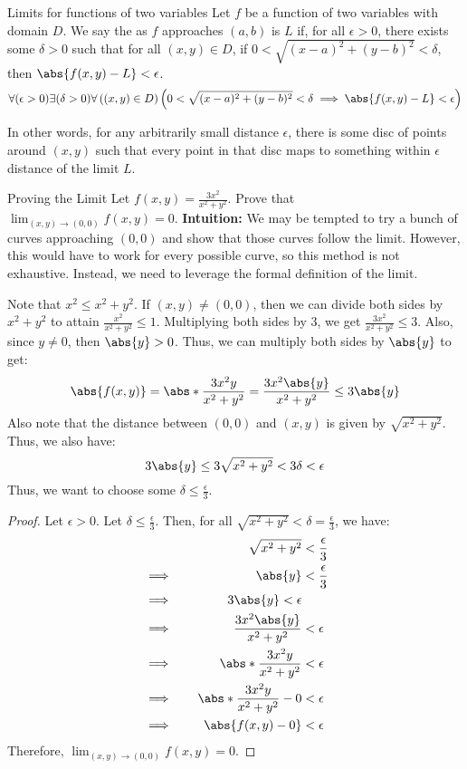 \documentclass[math]{amznotes}
\begin{document}
\begin{dfnbox}{Limits for functions of two variables}{}
    Let $f$ be a function of two variables with domain $D$. We say the  as $f$ approaches $(a,b)$ is $L$ if, for all $\epsilon > 0$, there exists some $\delta > 0$ such that for all $(x,y) \in D$, if $0 < \sqrt{(x-a)^2 + (y-b)^2} < \delta$, then $\abs{f(x,y) - L} < \epsilon$.
    \tcblower
    \[ \forall(\epsilon > 0) \exists(\delta > 0) \forall \left( (x,y) \in D \right) \left(0 < \sqrt{(x-a)^2 + (y-b)^2} < \delta \implies \abs{f(x,y) - L} < \epsilon\right) \]
\end{dfnbox}

In other words, for any arbitrarily small distance $\epsilon$, there is some disc of points around $(x,y)$ such that every point in that disc maps to something within $\epsilon$ distance of the limit $L$.

\begin{exbox}{Proving the Limit}{}
    Let $f(x,y) = \frac{3x^2}{x^2+y^2}$. Prove that $\lim_{(x,y) \to (0,0)} f(x,y) = 0$.
    \tcblower
    \textbf{Intuition:} We may be tempted to try a bunch of curves approaching $(0,0)$ and show that those curves follow the limit. However, this would have to work for every possible curve, so this method is not exhaustive. Instead, we need to leverage the formal definition of the limit.

    Note that $x^2 \leq x^2 + y^2$. If $(x,y) \neq (0,0)$, then we can divide both sides by $x^2 + y^2$ to attain $\frac{x^2}{x^2 + y^2} \leq 1$. Multiplying both sides by $3$, we get $\frac{3x^2}{x^2 + y^2} \leq 3$. Also, since $y \neq 0$, then $\abs{y} > 0$. Thus, we can multiply both sides by $\abs{y}$ to get:
    \[ \abs{f(x,y)} = \abs*{\frac{3x^2 y}{x^2+y^2}} = \frac{3x^2 \abs{y}}{x^2 + y^2} \leq 3 \abs{y} \]
    Also note that the distance between $(0,0)$ and $(x,y)$ is given by $\sqrt{x^2 + y^2}$. Thus, we also have:
    \[ 3\abs{y} \leq 3\sqrt{x^2 + y^2} < 3 \delta < \epsilon \]
    Thus, we want to choose some $\delta \leq \frac{\epsilon}{3}$.
    \begin{proof}
        Let $\epsilon > 0$. Let $\delta \leq \frac{\epsilon}{3}$. Then, for all $\sqrt{x^2 + y^2} < \delta  = \frac{\epsilon}{3}$, we have:
        \begin{alignat*}{2}
            && \sqrt{x^2 + y^2} &< \frac{\epsilon}{3} \\
            & \implies \quad & \abs{y} &< \frac{\epsilon}{3} \\
            & \implies & 3\abs{y} < \epsilon \\
            & \implies & \frac{3x^2\abs{y}}{x^2 + y^2} &< \epsilon \\
            & \implies & \abs*{\frac{3x^2 y}{x^2 + y^2}} &< \epsilon \\
            & \implies & \abs*{\frac{3x^2 y}{x^2 + y^2} - 0} &< \epsilon \\
            & \implies & \abs{f(x,y) - 0} &< \epsilon
        \end{alignat*}
        Therefore, $\lim_{(x,y) \to (0,0)} f(x,y) = 0$.
    \end{proof}
\end{exbox}
\end{document}
